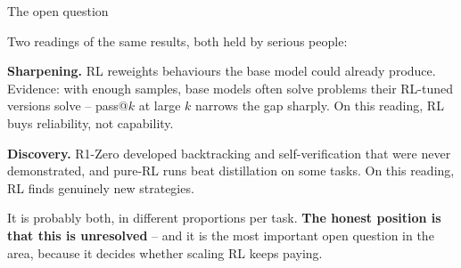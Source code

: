 \documentclass[aspectratio=169]{beamer}
\begin{document}
\begin{frame}{The open question}
  \begin{tcolorbox}[colback=armblue!8, colframe=armblue, boxrule=0.8pt, arc=2pt,
                    title={\textbf{Does RL add ability, or reveal it?}}]
    \small
    Two readings of the same results, both held by serious people:

    \vskip 5pt
    \textbf{Sharpening.} RL reweights behaviours the base model could already produce. Evidence:
    with enough samples, base models often solve problems their RL-tuned versions solve --
    pass@$k$ at large $k$ narrows the gap sharply. On this reading, RL buys reliability, not
    capability.

    \vskip 5pt
    \textbf{Discovery.} R1-Zero developed backtracking and self-verification that were never
    demonstrated, and pure-RL runs beat distillation on some tasks. On this reading, RL finds
    genuinely new strategies.
  \end{tcolorbox}

  \vskip 6pt
  \begin{center}
    \small
    It is probably both, in different proportions per task. \textbf{The honest position is that
    this is unresolved} -- and it is the most important open question in the area, because it
    decides whether scaling RL keeps paying.
  \end{center}
\end{frame}
\end{document}
